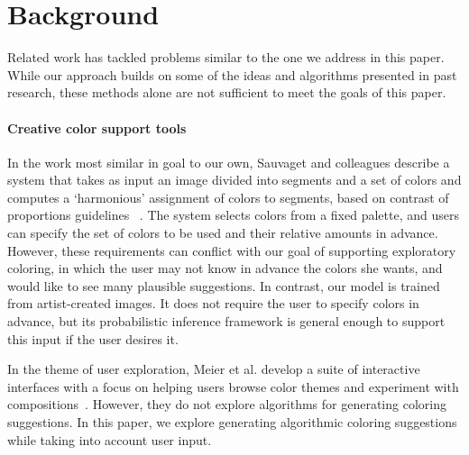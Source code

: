 \section{Background}
\label{sec:background}

Related work has tackled problems similar to the one we address in this paper. While our approach builds on some of the ideas and algorithms presented in past research, these methods alone are not sufficient to meet the goals of this paper.

\paragraph{Creative color support tools}
In the work most similar in goal to our own, Sauvaget and colleagues describe a system that takes as input an image divided into segments and a set of colors and computes a `harmonious' assignment of colors to segments, based on contrast of proportions guidelines ~. The system selects colors from a fixed palette, and users can specify the set of colors to be used and their relative amounts in advance. However, these requirements can conflict with our goal of supporting exploratory coloring, in which the user may not know in advance the colors she wants, and would like to see many plausible suggestions. In contrast, our model is trained from artist-created images. It does not require the user to specify colors in advance, but its probabilistic inference framework is general enough to support this input if the user desires it.

In the theme of user exploration, Meier et al. develop a suite of interactive interfaces with a focus on helping users browse color themes and experiment with compositions~. However, they do not explore algorithms for generating coloring suggestions. In this paper, we explore generating algorithmic coloring suggestions while taking into account user input.

